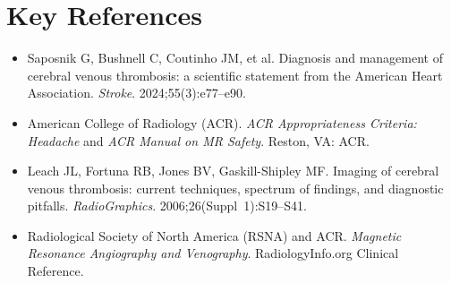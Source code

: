 \section{Key References}
\begin{itemize}
\item Saposnik G, Bushnell C, Coutinho JM, et al. Diagnosis and management of cerebral venous thrombosis: a scientific statement from the American Heart Association. \textit{Stroke}. 2024;55(3):e77--e90.
\item American College of Radiology (ACR). \textit{ACR Appropriateness Criteria: Headache} and \textit{ACR Manual on MR Safety}. Reston, VA: ACR.
\item Leach JL, Fortuna RB, Jones BV, Gaskill-Shipley MF. Imaging of cerebral venous thrombosis: current techniques, spectrum of findings, and diagnostic pitfalls. \textit{RadioGraphics}. 2006;26(Suppl~1):S19--S41.
\item Radiological Society of North America (RSNA) and ACR. \textit{Magnetic Resonance Angiography and Venography}. RadiologyInfo.org Clinical Reference.
\end{itemize}
